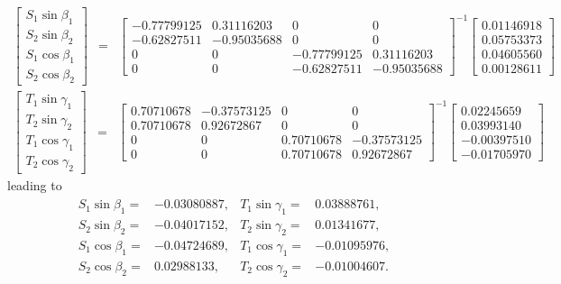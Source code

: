 \documentclass [12pt, a4paper] {article}
\begin{document}
\begin {eqnarray}
    \begin {bmatrix}
        S_1\sin\beta_1 \\
        S_2\sin\beta_2 \\
        S_1\cos\beta_1 \\
        S_2\cos\beta_2
    \end {bmatrix}
    &=&
    \begin {bmatrix}
        -0.77799125 & 0.31116203 & 0 & 0 \\
        -0.62827511 & -0.95035688 & 0 & 0 \\
        0 & 0 & -0.77799125 & 0.31116203 \\
        0 & 0 & -0.62827511 & -0.95035688
    \end {bmatrix}^{-1}
    \begin {bmatrix}
        0.01146918 \\
        0.05753373 \\
        0.04605560 \\
        0.00128611
    \end {bmatrix}
    \quad
\end {eqnarray}
\begin {eqnarray}
    \begin {bmatrix}
        T_1\sin\gamma_1 \\
        T_2\sin\gamma_2 \\
        T_1\cos\gamma_1 \\
        T_2\cos\gamma_2
    \end {bmatrix}
    &=&
    \begin {bmatrix}
        0.70710678 & -0.37573125 & 0 & 0 \\
        0.70710678 &  0.92672867 & 0 & 0 \\
        0 & 0 & 0.70710678 & -0.37573125 \\
        0 & 0 & 0.70710678 &  0.92672867
    \end {bmatrix}^{-1}
    \begin {bmatrix}
        0.02245659 \\
        0.03993140 \\
        -0.00397510 \\
        -0.01705970
    \end {bmatrix}
    \quad
\end {eqnarray}
leading to 
\begin {eqnarray}
    \begin{array}{llll}
        S_1\sin\beta_1 = & -0.03080887, & T_1\sin\gamma_1 = & 0.03888761,\\ 
        S_2\sin\beta_2 = & -0.04017152, & T_2\sin\gamma_2 = & 0.01341677,\\
        S_1\cos\beta_1 = & -0.04724689, & T_1\cos\gamma_1 = & -0.01095976,\\
        S_2\cos\beta_2 = &  0.02988133, & T_2\cos\gamma_2 = & -0.01004607.
    \end {array}
\end {eqnarray}
\end{document}
